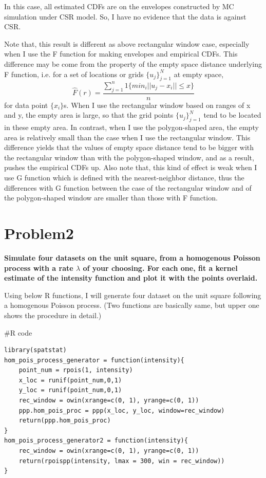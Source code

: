 \documentclass{article}
\newenvironment{Rcode}%
{%
    \begin{mdframed}
    \#R code
    \begin{small}
}
{%
    \end{small}
    \end{mdframed}
}
\begin{document}
In this case, all estimated CDFs are on the envelopes constructed by MC simulation under CSR model.
So, I have no evidence that the data is against CSR.

Note that, this result is different as above rectangular window case,
especially when I use the F function for making envelopes and empirical CDFs.
This difference may be come from the property of the empty space distance
underlying F function, i.e. for a set of locations or grids $\{u_j\}_{j=1}^{N}$ at empty space,
\[\hat{F}(r) = \frac{\sum_{j=1}^{n} 1\{min_{i} ||u_j - x_i||\leq x\}}{n}\]
for data point $\{x_i\}$s. 
When I use the rectangular window based on ranges of x and y,
the empty area is large, so that the grid points $\{u_j\}_{j=1}^{N}$ tend to
be located in these empty area. In contrast, when I use the polygon-shaped area,
the empty area is relatively small than the case when I use the rectangular window.
This difference yields that the values of empty space distance tend to be bigger with the rectangular window
than with the polygon-shaped window, and as a result, pushes the empirical CDFs up.
Also note that, this kind of effect is weak when I use G function which is defined with the nearest-neighbor distance,
thus the differences with G function between the case of the rectangular window and of the polygon-shaped window are smaller
than those with F function.



\clearpage
\section{Problem2}
\textbf{
Simulate four datasets on the unit square, from a homogenous Poisson process with a rate $\lambda$ of your choosing.
For each one, fit a kernel estimate of the intensity function and plot it with the points overlaid.
}

Using below R functions, I will generate four dataset on the unit square following a homogenous Poisson process.
(Two functions are basically same, but upper one shows the  procedure in detail.)

\begin{Rcode}
    \begin{verbatim}
library(spatstat)
hom_pois_process_generator = function(intensity){
    point_num = rpois(1, intensity)
    x_loc = runif(point_num,0,1)
    y_loc = runif(point_num,0,1)
    rec_window = owin(xrange=c(0, 1), yrange=c(0, 1))
    ppp.hom_pois_proc = ppp(x_loc, y_loc, window=rec_window)
    return(ppp.hom_pois_proc)
}
hom_pois_process_generator2 = function(intensity){
    rec_window = owin(xrange=c(0, 1), yrange=c(0, 1))
    return(rpoispp(intensity, lmax = 300, win = rec_window))
}
    \end{verbatim}
\end{Rcode}
\end{document}

